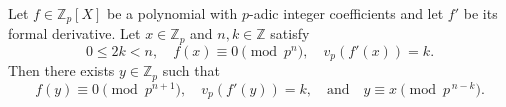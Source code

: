 Let $f \in \mathbb{Z}_p[X]$ be a polynomial with $p$-adic integer coefficients and let $f'$ be its formal derivative. Let $x \in \mathbb{Z}_p$ and $n, k \in \mathbb{Z}$ satisfy
$$0 \leq 2k < n, \quad f(x) \equiv 0 \pmod{p^n}, \quad v_p(f'(x)) = k.$$
Then there exists $y \in \mathbb{Z}_p$ such that
$$f(y) \equiv 0 \pmod{p^{n+1}}, \quad v_p(f'(y)) = k, \quad \text{and} \quad y \equiv x \pmod{p^{\,n-k}}.$$
